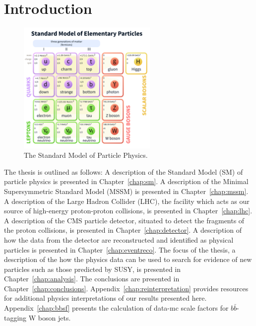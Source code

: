 \chapter{Introduction}

\begin{figure}
\centering
\includegraphics[width=0.6\textwidth]{figs/StandardModelofElementaryParticles.pdf}
\caption{The Standard Model of Particle Physics.}
\label{fig:sm}
\end{figure}

The thesis is outlined as follows: A description of the Standard Model (SM) of particle physics is presented in Chapter~\ref{chap:sm}. A description of the Minimal Supersymmetric Standard Model (MSSM) is presented in Chapter~\ref{chap:mssm}. A description of the Large Hadron Collider (LHC), the facility which acts as our source of high-energy proton-proton collisions, is presented in Chapter~\ref{chap:lhc}. A description of the CMS particle detector, situated to detect the fragments of the proton collisions, is presented in Chapter~\ref{chap:detector}. A description of how the data from the detector are reconstructed and identified as physical particles is presented in Chapter~\ref{chap:eventreco}. The focus of the thesis, a description of the how the physics data can be used to search for evidence of new particles such as those predicted by SUSY, is presented in Chapter~\ref{chap:analysis}. The conclusions are presented in Chapter~\ref{chap:conclusions}. Appendix~\ref{chap:reinterpretation} provides resources for additional physics interpretations of our results presented here. Appendix~\ref{chap:bbsf} presents the calculation of data-mc scale factors for $b\bar{b}$-tagging W boson jets.
